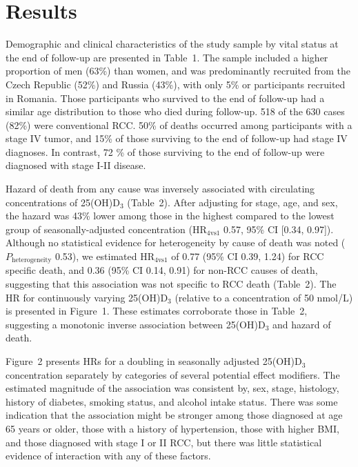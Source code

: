 \documentclass[a4paper,11pt]{article}
\begin{document}
\section*{Results}
Demographic and clinical characteristics of the study sample by vital status at 
the end of follow-up are presented in Table~1. The sample included a higher 
proportion of men (63\%) than women, and was predominantly recruited from the 
Czech Republic (52\%) and Russia (43\%), with only 5\% or participants 
recruited in Romania. Those participants who survived to the end of follow-up 
had a similar age distribution to those who died during follow-up. 518 
of the 630 cases (82\%) were conventional RCC. 50\% of deaths occurred among 
participants with a stage IV tumor, and 15\% of those surviving to the end of 
follow-up had stage IV diagnoses. In contrast, 72 \% of those surviving to the 
end of follow-up were diagnosed with stage I-II disease.

Hazard of death from any cause was inversely associated with 
circulating concentrations of 25(OH)D$_3$ (Table~2). After adjusting for 
stage, age, and sex, the hazard was 43\% lower among those in the highest 
compared to the lowest group of seasonally-adjusted concentration 
(HR$_{4\text{vs}1}$ 0.57, 95\% CI [0.34, 0.97]). Although no statistical 
evidence for heterogeneity by cause of death was noted 
($P_\text{heterogeneity}$ 0.53), we estimated HR$_{4\text{vs}1}$ of 0.77 
(95\% CI 0.39, 1.24) for RCC specific death, and 0.36 (95\% CI 0.14, 0.91) for 
non-RCC causes of death, suggesting that this association was not specific to 
RCC death (Table~2). The HR for continuously varying 25(OH)D$_3$ (relative to a 
concentration of 50 nmol/L) is presented in Figure~1. These estimates 
corroborate those in Table~2, suggesting a monotonic inverse association between 
25(OH)D$_3$ and hazard of death.

Figure~2 presents HRs for a doubling in seasonally adjusted 25(OH)D$_3$ 
concentration separately by categories of several potential effect modifiers. 
The estimated magnitude of the association was consistent by, sex, stage, 
histology, history of diabetes, smoking status, and alcohol intake status. 
There was some indication that the association might be stronger among those 
diagnosed at age 65 years or older, those with a history of hypertension, those 
with higher BMI, and those diagnosed with stage I or II RCC, but there was 
little statistical evidence of interaction with any of these factors. 
\end{document}

